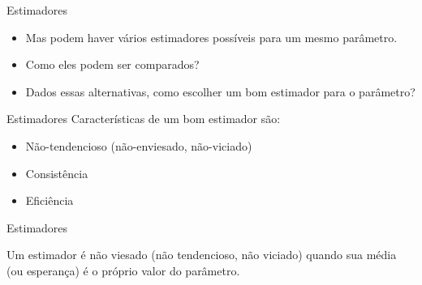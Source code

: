 \documentclass{beamer}
\begin{document}

\begin{frame}{Estimadores}
  \begin{itemize}
  \item Mas podem haver vários estimadores possíveis para um mesmo parâmetro.
  \item Como eles podem ser comparados?
  \item Dados essas alternativas, como escolher um bom estimador para
    o parâmetro?
  \end{itemize}
\end{frame}

\begin{frame}{Estimadores}
Características de um bom estimador são:
\begin{itemize}
\item Não-tendencioso (não-enviesado, não-viciado)
\item Consistência
\item Eficiência
\end{itemize}
\end{frame}

\begin{frame}{Estimadores}
  \begin{definition}
    Um estimador é \alert{não viesado} (não tendencioso, não viciado)
    quando sua média (ou esperança) é o próprio valor do parâmetro.
  \end{definition}
\end{frame}

\end{document}
